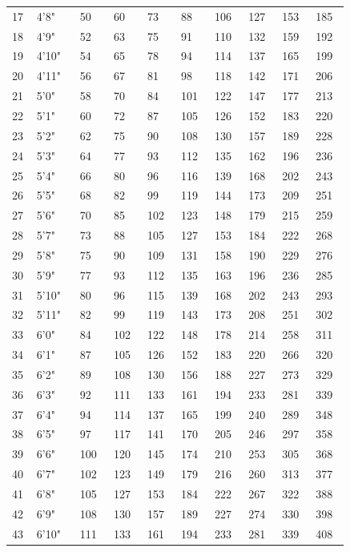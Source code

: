 \begin{multicols*}{2}
\begin{tcolorbox}[breakable,boxrule=0pt,title=\textbf{Height and Weight Table}]
\begin{tabular}{@{} p{0.02\linewidth} p{0.07\linewidth} p{0.05\linewidth} p{0.05\linewidth} p{0.05\linewidth} p{0.05\linewidth} p{0.05\linewidth} p{0.05\linewidth} p{0.05\linewidth} p{0.05\linewidth} }
17 & 4'8" & 50 & 60 & 73 & 88 & 106 & 127 & 153 & 185\\
18 & 4'9" & 52 & 63 & 75 & 91 & 110 & 132 & 159 & 192\\
19 & 4'10" & 54 & 65 & 78 & 94 & 114 & 137 & 165 & 199\\
20 & 4'11" & 56 & 67 & 81 & 98 & 118 & 142 & 171 & 206\\
21 & 5'0" & 58 & 70 & 84 & 101 & 122 & 147 & 177 & 213\\
22 & 5'1" & 60 & 72 & 87 & 105 & 126 & 152 & 183 & 220\\
23 & 5'2" & 62 & 75 & 90 & 108 & 130 & 157 & 189 & 228\\
24 & 5'3" & 64 & 77 & 93 & 112 & 135 & 162 & 196 & 236\\
25 & 5'4" & 66 & 80 & 96 & 116 & 139 & 168 & 202 & 243\\
26 & 5'5" & 68 & 82 & 99 & 119 & 144 & 173 & 209 & 251\\
27 & 5'6" & 70 & 85 & 102 & 123 & 148 & 179 & 215 & 259\\
28 & 5'7" & 73 & 88 & 105 & 127 & 153 & 184 & 222 & 268\\
29 & 5'8" & 75 & 90 & 109 & 131 & 158 & 190 & 229 & 276\\
30 & 5'9" & 77 & 93 & 112 & 135 & 163 & 196 & 236 & 285\\
31 & 5'10" & 80 & 96 & 115 & 139 & 168 & 202 & 243 & 293\\
32 & 5'11" & 82 & 99 & 119 & 143 & 173 & 208 & 251 & 302\\
33 & 6'0" & 84 & 102 & 122 & 148 & 178 & 214 & 258 & 311\\
34 & 6'1" & 87 & 105 & 126 & 152 & 183 & 220 & 266 & 320\\
35 & 6'2" & 89 & 108 & 130 & 156 & 188 & 227 & 273 & 329\\
36 & 6'3" & 92 & 111 & 133 & 161 & 194 & 233 & 281 & 339\\
37 & 6'4" & 94 & 114 & 137 & 165 & 199 & 240 & 289 & 348\\
38 & 6'5" & 97 & 117 & 141 & 170 & 205 & 246 & 297 & 358\\
39 & 6'6" & 100 & 120 & 145 & 174 & 210 & 253 & 305 & 368\\
40 & 6'7" & 102 & 123 & 149 & 179 & 216 & 260 & 313 & 377\\
41 & 6'8" & 105 & 127 & 153 & 184 & 222 & 267 & 322 & 388\\
42 & 6'9" & 108 & 130 & 157 & 189 & 227 & 274 & 330 & 398\\
43 & 6'10" & 111 & 133 & 161 & 194 & 233 & 281 & 339 & 408\\

\end{tabular}
\end{tcolorbox}
\end{multicols*}
